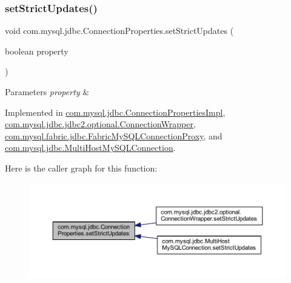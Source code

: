 \subsubsection{\texorpdfstring{set\+Strict\+Updates()}{setStrictUpdates()}}
{\footnotesize\ttfamily void com.\+mysql.\+jdbc.\+Connection\+Properties.\+set\+Strict\+Updates (\begin{DoxyParamCaption}\item[{boolean}]{property }\end{DoxyParamCaption})}


\begin{DoxyParams}{Parameters}
{\em property} & \\
\hline
\end{DoxyParams}


Implemented in \mbox{\hyperlink{classcom_1_1mysql_1_1jdbc_1_1_connection_properties_impl_af4a77c357657267b445886c49a4a5388}{com.\+mysql.\+jdbc.\+Connection\+Properties\+Impl}}, \mbox{\hyperlink{classcom_1_1mysql_1_1jdbc_1_1jdbc2_1_1optional_1_1_connection_wrapper_afcbd497f79720ae946cda438dad6ec65}{com.\+mysql.\+jdbc.\+jdbc2.\+optional.\+Connection\+Wrapper}}, \mbox{\hyperlink{classcom_1_1mysql_1_1fabric_1_1jdbc_1_1_fabric_my_s_q_l_connection_proxy_a66b0830c0cf11bd577fa1ec1aa179352}{com.\+mysql.\+fabric.\+jdbc.\+Fabric\+My\+S\+Q\+L\+Connection\+Proxy}}, and \mbox{\hyperlink{classcom_1_1mysql_1_1jdbc_1_1_multi_host_my_s_q_l_connection_ae687926e547ee7430e22ed60f970b1dc}{com.\+mysql.\+jdbc.\+Multi\+Host\+My\+S\+Q\+L\+Connection}}.

Here is the caller graph for this function\+:\nopagebreak
\begin{figure}[H]
\begin{center}
\leavevmode
\includegraphics[width=350pt]{interfacecom_1_1mysql_1_1jdbc_1_1_connection_properties_a6b1583c38f50feb05d85d5f8357a998c_icgraph}
\end{center}
\end{figure}
\mbox{\label{interfacecom_1_1mysql_1_1jdbc_1_1_connection_properties_ac1fb7af1cc73512dd8dac99bdc7a5602}} 
